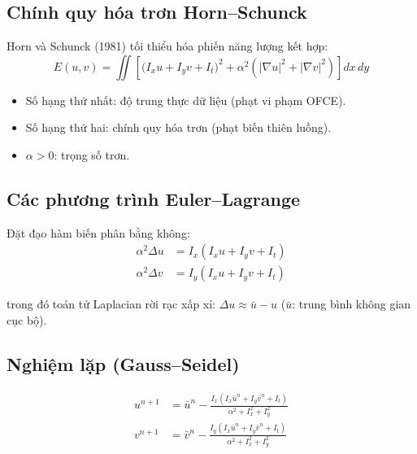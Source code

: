 \documentclass[12pt, a4paper]{article}
\begin{document}
\subsection{Chính quy hóa trơn Horn--Schunck}

Horn và Schunck (1981) tối thiểu hóa phiến năng lượng kết hợp:
\begin{equation}
  E(u,v)
  = \iint \left[
      \bigl(I_x u + I_y v + I_t\bigr)^2
      + \alpha^2\!\left(\lvert\nabla u\rvert^2 + \lvert\nabla v\rvert^2\right)
    \right] dx\, dy
  \label{eq:hs_energy}
\end{equation}

\begin{itemize}
  \item Số hạng thứ nhất: độ trung thực dữ liệu (phạt vi phạm OFCE).
  \item Số hạng thứ hai: chính quy hóa trơn (phạt biến thiên luồng).
  \item $\alpha > 0$: trọng số trơn.
\end{itemize}

\subsection{Các phương trình Euler--Lagrange}

Đặt đạo hàm biến phân bằng không:
\begin{align}
  \alpha^2 \Delta u &= I_x\!\left(I_x u + I_y v + I_t\right) \label{eq:el_u} \\
  \alpha^2 \Delta v &= I_y\!\left(I_x u + I_y v + I_t\right) \label{eq:el_v}
\end{align}

trong đó toán tử Laplacian rời rạc xấp xỉ:
$\Delta u \approx \bar{u} - u$ ($\bar{u}$: trung bình không gian cục bộ).

\subsection{Nghiệm lặp (Gauss--Seidel)}

\begin{align}
  u^{n+1} &= \bar{u}^n
    - \frac{I_x\!\left(I_x \bar{u}^n + I_y \bar{v}^n + I_t\right)}
           {\alpha^2 + I_x^2 + I_y^2}
  \label{eq:hs_iter_u} \\[6pt]
  v^{n+1} &= \bar{v}^n
    - \frac{I_y\!\left(I_x \bar{u}^n + I_y \bar{v}^n + I_t\right)}
           {\alpha^2 + I_x^2 + I_y^2}
  \label{eq:hs_iter_v}
\end{align}
\end{document}
